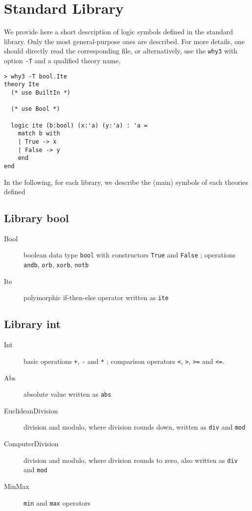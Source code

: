\chapter{Standard Library}
\label{chap:library}

We provide here a short description of logic symbols defined in the
standard library. Only the most general-purpose ones are
described. For more details, one should directly read the
corresponding file, or alternatively, use the \verb|why3| with option \verb|-T| and a qualified theory name, \eg
\begin{verbatim}
> why3 -T bool.Ite
theory Ite
  (* use BuiltIn *)
  
  (* use Bool *)
  
  logic ite (b:bool) (x:'a) (y:'a) : 'a =
    match b with
    | True -> x
    | False -> y
    end
end
\end{verbatim}

In the following, for each library, we describe the (main) symbols of
each theories defined

\section{Library bool}

\begin{description}

\item[Bool] boolean data type \verb|bool| with constructors \verb|True| and
  \verb|False| ; operations \verb|andb|, \verb|orb|, \verb|xorb|, \verb|notb|

\item[Ite] polymorphic if-then-else operator written as \verb|ite|

\end{description}

\section{Library int}

\begin{description}

\item[Int] basic operations \verb|+|, \verb|-| and \verb|*| ; comparison
  operators \verb|<|, \verb|>|, \verb|>=| and \verb|<=|.

\item[Abs] absolute value written as \verb|abs|

\item[EuclideanDivision] division and modulo, where division rounds
  down, written as \verb|div| and \verb|mod|

\item[ComputerDivision] division and modulo, where division rounds to
  zero, also written as \verb|div| and \verb|mod|

\item[MinMax] \verb|min| and \verb|max| operators

\end{description}

